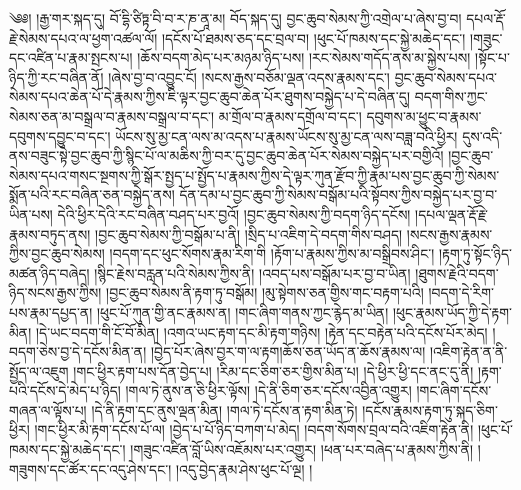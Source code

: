 ༄༅། །རྒྱ་གར་སྐད་དུ། བོ་དྷི་ཙིཏྟ་བི་བ་ར་ཎ་ནཱ་མ། བོད་སྐད་དུ། བྱང་ཆུབ་སེམས་ཀྱི་འགྲེལ་པ་ཞེས་བྱ་བ། དཔལ་རྡོ་རྗེ་སེམས་དཔའ་ལ་ཕྱག་འཚལ་ལོ། །དངོས་པོ་ཐམས་ཅད་དང་བྲལ་བ། །ཕུང་པོ་ཁམས་དང་སྐྱེ་མཆེད་དང་། །གཟུང་དང་འཛིན་པ་རྣམ་སྤངས་པ། །ཆོས་བདག་མེད་པར་མཉམ་ཉིད་པས། །རང་སེམས་གདོད་ནས་མ་སྐྱེས་པས། །སྟོང་པ་ཉིད་ཀྱི་རང་བཞིན་ནོ། །ཞེས་བྱ་བ་འབྱུང་ངོ། །སངས་རྒྱས་བཅོམ་ལྡན་འདས་རྣམས་དང་། བྱང་ཆུབ་སེམས་དཔའ་སེམས་དཔའ་ཆེན་པོ་དེ་རྣམས་ཀྱིས་ཇི་ལྟར་བྱང་ཆུབ་ཆེན་པོར་ཐུགས་བསྐྱེད་པ་དེ་བཞིན་དུ། བདག་གིས་ཀྱང་སེམས་ཅན་མ་བསྒྲལ་བ་རྣམས་བསྒྲལ་བ་དང་། མ་གྲོལ་བ་རྣམས་དགྲོལ་བ་དང་། དབུགས་མ་ཕྱུང་བ་རྣམས་དབུགས་དབྱུང་བ་དང་། ཡོངས་སུ་མྱ་ངན་ལས་མ་འདས་པ་རྣམས་ཡོངས་སུ་མྱ་ངན་ལས་བཟླ་བའི་ཕྱིར། དུས་འདི་ནས་བཟུང་སྟེ་བྱང་ཆུབ་ཀྱི་སྙིང་པོ་ལ་མཆིས་ཀྱི་བར་དུ་བྱང་ཆུབ་ཆེན་པོར་སེམས་བསྐྱེད་པར་བགྱིའོ། །བྱང་ཆུབ་སེམས་དཔའ་གསང་སྔགས་ཀྱི་སྒོར་སྤྱད་པ་སྤྱོད་པ་རྣམས་ཀྱིས་དེ་ལྟར་ཀུན་རྫོབ་ཀྱི་རྣམ་པས་བྱང་ཆུབ་ཀྱི་སེམས་སྨོན་པའི་རང་བཞིན་ཅན་བསྐྱེད་ནས། དོན་དམ་པ་བྱང་ཆུབ་ཀྱི་སེམས་བསྒོམ་པའི་སྟོབས་ཀྱིས་བསྐྱེད་པར་བྱ་བ་ཡིན་པས། དེའི་ཕྱིར་དེའི་རང་བཞིན་བཤད་པར་བྱའོ། །བྱང་ཆུབ་སེམས་ཀྱི་བདག་ཉིད་དངོས། །དཔལ་ལྡན་རྡོ་རྗེ་རྣམས་བཏུད་ནས། །བྱང་ཆུབ་སེམས་ཀྱི་བསྒོམ་པ་ནི། །སྲིད་པ་འཇིག་དེ་བདག་གིས་བཤད། །སངས་རྒྱས་རྣམས་ཀྱིས་བྱང་ཆུབ་སེམས། །བདག་དང་ཕུང་སོགས་རྣམ་རིག་གི །རྟོག་པ་རྣམས་ཀྱིས་མ་བསྒྲིབས་ཤིང་། །རྟག་ཏུ་སྟོང་ཉིད་མཚན་ཉིད་བཞེད། །སྙིང་རྗེས་བརླན་པའི་སེམས་ཀྱིས་ནི། །འབད་པས་བསྒོམ་པར་བྱ་བ་ཡིན། །ཐུགས་རྗེའི་བདག་ཉིད་སངས་རྒྱས་ཀྱིས། །བྱང་ཆུབ་སེམས་ནི་རྟག་ཏུ་བསྒོམ། །མུ་སྟེགས་ཅན་གྱིས་གང་བརྟག་པའི། །བདག་དེ་རིག་པས་རྣམ་དཔྱད་ན། །ཕུང་པོ་ཀུན་གྱི་ནང་རྣམས་ན། །གང་ཞིག་གནས་ཀྱང་རྙེད་མ་ཡིན། །ཕུང་རྣམས་ཡོད་ཀྱི་དེ་རྟག་མིན། །དེ་ཡང་བདག་གི་ངོ་བོ་མིན། །འགའ་ཡང་རྟག་དང་མི་རྟག་གཉིས། །རྟེན་དང་བརྟེན་པའི་དངོས་པོར་མེད། །བདག་ཅེས་བྱ་དེ་དངོས་མིན་ན། །བྱེད་པོར་ཞེས་བྱར་ག་ལ་རྟག།ཆོས་ཅན་ཡོད་ན་ཆོས་རྣམས་ལ། །འཇིག་རྟེན་ན་ནི་སྤྱོད་ལ་འཇུག །གང་ཕྱིར་རྟག་པས་དོན་བྱེད་པ། །རིམ་དང་ཅིག་ཅར་གྱིས་མིན་པ། །དེ་ཕྱིར་ཕྱི་དང་ནང་དུ་ནི། །རྟག་པའི་དངོས་དེ་མེད་པ་ཉིད། །གལ་ཏེ་ནུས་ན་ཅི་ཕྱིར་ལྟོས། །དེ་ནི་ཅིག་ཅར་དངོས་འབྱིན་འགྱུར། །གང་ཞིག་དངོས་གཞན་ལ་ལྟོས་པ། །དེ་ནི་རྟག་དང་ནུས་ལྡན་མིན། །གལ་ཏེ་དངོས་ན་རྟག་མིན་ཏེ། །དངོས་རྣམས་རྟག་ཏུ་སྐད་ཅིག་ཕྱིར། །གང་ཕྱིར་མི་རྟག་དངོས་པོ་ལ། །བྱེད་པ་པོ་ཉིད་བཀག་པ་མེད། །བདག་སོགས་བྲལ་བའི་འཇིག་རྟེན་ནི། །ཕུང་པོ་ཁམས་དང་སྐྱེ་མཆེད་དང་། །གཟུང་འཛིན་བློ་ཡིས་འཇོམས་པར་འགྱུར། །ཕན་པར་བཞེད་པ་རྣམས་ཀྱིས་ནི། །གཟུགས་དང་ཚོར་དང་འདུ་ཤེས་དང་། །འདུ་བྱེད་རྣམ་ཤེས་ཕུང་པོ་ལྔ། །
